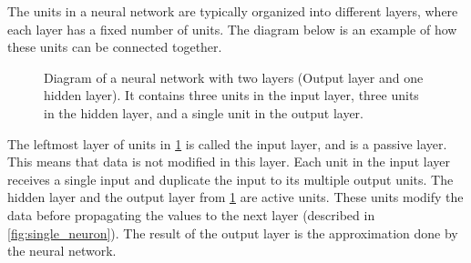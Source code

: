 The units in a neural network are typically organized into different layers, where each layer has a fixed number of units. The diagram below is an example of how these units can be connected together.

\begin{figure}[H]
  \centering

    \caption{Diagram of a neural network with two layers (Output layer and one hidden layer). It contains three units in the input layer, three units in the hidden layer, and a single unit in the output layer. }
    \label{fig:single_layered_neural_network}
\end{figure}


The leftmost layer of units in \ref{fig:single_layered_neural_network} is called the input layer, and is a passive layer. This means that data is not modified in this layer. Each unit in the input layer receives a single input and duplicate the input to its multiple output units. The hidden layer and the output layer from \ref{fig:single_layered_neural_network} are active units. These units modify the data before propagating the values to the next layer (described in \ref{fig:single_neuron}). The result of the output layer is the approximation done by the neural network. \parencite{smith_scientist_1997} 

